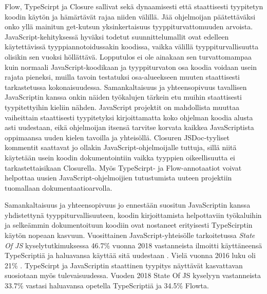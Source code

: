 Flow, TypeScirpt ja Closure sallivat sekä dynaamisesti että
staattisesti tyypitetyn koodin käytön ja hämärtävät rajaa niiden välillä.
Jää ohjelmoijan päätettäväksi onko yllä mainitun get-kutsun yksinkertaisuus
tyyppiturvattomuuden arvoista. JavaScript-kehityksessä hyväksi todetut
suunnittelumallit ovat edelleen käytettävissä tyyppiannotoidussakin
koodissa, vaikka välillä tyyppiturvallisuutta olisikin sen vuoksi höllättävä.
Lopputulos ei ole ainakaan sen turvattomampaa kuin normaali JavaScript-koodikaan
ja tyyppiturvaton osa koodia voidaan usein rajata pieneksi, muilla tavoin
testatuksi osa-alueekseen muuten staattisesti tarkastetussa kokonaisuudessa.
Samankaltaisuus ja yhteensopivuus tavallisen JavaScriptin kanssa onkin
näiden työkalujen tärkein etu muihin staattisesti tyypitettyihin kieliin
nähden. JavaScript projektit on mahdollista muuttaa vaiheittain staattisesti
tyypitetyksi kirjoittamatta koko ohjelman koodia alusta asti uudestaan, eikä
ohjelmoijan itsensä tarvitse korvata kaikkea JavaScriptista oppimaansa
uuden kielen tavoilla ja yhteisöllä. Closuren JSDoc-tyyliset kommentit
saattavat jo ollakin JavaScript-ohjelmoijalle tuttuja, sillä niitä käytetään
usein koodin dokumentointiin vaikka tyyppien oikeellisuutta ei
tarkastettaisikaan Closurella. Myös TypeScirpt- ja Flow-annotaatiot voivat
helpottaa uusien JavaScript-ohjelmoijien tutustumista uuteen projektiin
tuomallaan dokumentaatioarvolla.

Samankaltaisuus ja yhteensopivuus jo ennestään suositun JavaScriptin kanssa
yhdistettynä tyyppiturvallisuuteen, koodin kirjoittamista helpottaviin
työkaluihin ja selkeämmin dokumentoituun koodiin ovat nostaneet erityisesti
TypeScirptin käytön nopeaan kasvuun. Vuosittainen JavaScript-yhteisölle
tarkoitetussa \textit{State Of JS} kyselytutkimuksessa 46.7\% vuonna 2018
vastanneista ilmoitti käyttäneensä TypeScriptiä ja haluavansa
käyttää sitä uudestaan \cite{StateOfJs2018}.
Vielä vuonna 2016 luku oli 21\% \cite{StateOfJs2016}. TypeScirpt ja \newline
JavaScriptin staattinen tyypitys näyttävät kasvattavan suosiotaan myös
tulevaisuudessa. Vuoden 2018 State Of JS kyselyyn vastanneista 33.7\%
vastasi haluavansa opetella TypeScriptiä ja 34.5\% Flowta.

